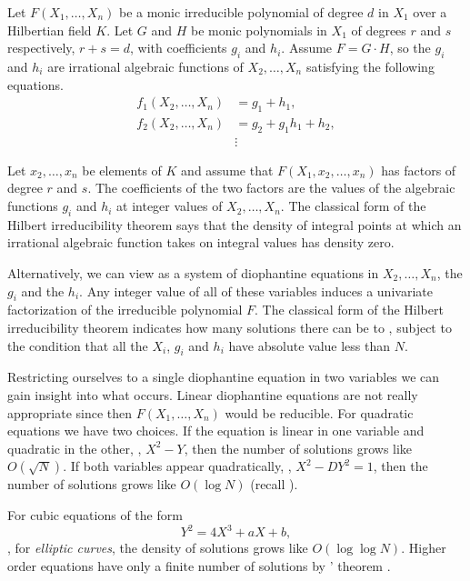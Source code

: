Let $F(X_1, \ldots, X_n)$ be a monic irreducible polynomial of degree
$d$ in $X_1$ over a Hilbertian field $K$.  Let $G$ and $H$ be monic
polynomials in $X_1$ of degrees $r$ and $s$ respectively, $r+s = d$,
with coefficients $g_i$ and $h_i$.  Assume $F = G \cdot H$, so the
$g_i$ and $h_i$ are irrational algebraic functions of $X_2, \ldots,
X_n$ satisfying the following equations.
\begin{equation} \label{HIT:Algebraic:Eq}
\begin{aligned}
f_1(X_2, \ldots, X_n) & = g_1 + h_1, \\
f_2(X_2, \ldots, X_n) & = g_2 + g_1  h_1 + h_2, \\
& \vdots
\end{aligned}
\end{equation}

Let $x_2, \ldots, x_n$ be elements of $K$ and assume that $F(X_1, x_2,
\ldots, x_n)$ has factors of degree $r$ and $s$.  The coefficients
of the two factors are the values of the algebraic functions $g_i$ and
$h_i$ at integer values of $X_2, \ldots, X_n$.  The classical form of
the Hilbert irreducibility theorem says that the density of integral
points at which an irrational algebraic function takes on integral
values has density zero.

Alternatively, we can view  as a system of
diophantine equations in $X_2, \ldots, X_n$, the $g_i$ and the $h_i$.
Any integer value of all of these variables induces a univariate
factorization of the irreducible polynomial $F$.  The classical form
of the Hilbert irreducibility theorem indicates how many solutions
there can be to , subject to the condition
that all the $X_i$, $g_i$ and $h_i$ have absolute value less than $N$.

Restricting ourselves to a single diophantine equation in two
variables we can gain insight into what occurs.  Linear diophantine
equations are not really appropriate since then $F(X_1, \ldots, X_n)$
would be reducible.  For quadratic equations we have two choices.  If
the equation is linear in one variable and quadratic in the other,
\eg, $X^2 - Y$, then the number of solutions grows like $O(\sqrt{N})$.
If both variables appear quadratically, \eg, $X^2 - D Y^2 = 1$, then
the number of solutions grows like $O(\log N)$ (recall
). 

For cubic equations of the form 
\[
Y^2 = 4X^3 + a X + b,
\]
\ie, for {\em elliptic curves}, the density of
solutions grows like $O(\log \log N)$.  Higher order equations have
only a finite number of solutions by {\Faltings}' theorem
\cite{Faltings1984-fj,Faltings1983-fm,Faltings1986-wb}.

